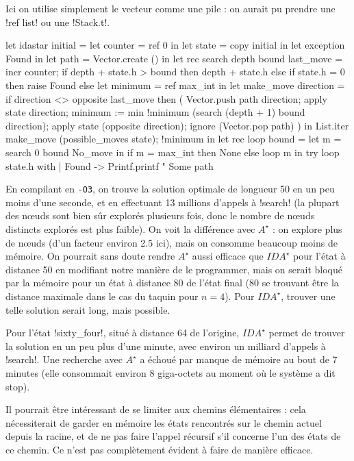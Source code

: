 \begin{ques}
  Ici on utilise simplement le vecteur comme une pile :
  on aurait pu prendre une \ml!ref list! ou une \ml!Stack.t!.
\begin{ocaml}
let idastar initial =
  let counter = ref 0 in
  let state = copy initial in
  let exception Found in
  let path = Vector.create () in
  let rec search depth bound last_move =
    incr counter;
    if depth + state.h > bound then depth + state.h
    else if state.h = 0 then raise Found
    else
      let minimum = ref max_int in
      let make_move direction =
        if direction <> opposite last_move then (
          Vector.push path direction;
          apply state direction;
          minimum := min !minimum (search (depth + 1) bound direction);
          apply state (opposite direction);
          ignore (Vector.pop path)
        ) in
      List.iter make_move (possible_moves state);
      !minimum in
  let rec loop bound =
    let m = search 0 bound No_move in
    if m = max_int then None
    else loop m in
  try
    loop state.h
  with
  | Found ->
    Printf.printf "%
    Some path
\end{ocaml}
  En compilant en \verb!-O3!, on trouve la solution optimale de longueur
  50 en un peu moins d'une seconde, et en effectuant 13 millions
  d'appels à \ml!search! (la plupart des nœuds sont bien sûr explorés
  plusieurs fois, donc le nombre de nœuds distincts explorés est plus faible).
  On voit la différence avec $A^{\star}$ : on explore plus de nœuds
  (d'un facteur environ 2.5 ici), mais on consomme beaucoup moins de
  mémoire. On pourrait sans doute rendre $A^{\star}$ aussi efficace que
  $IDA^{\star}$ pour l'état à distance 50 en modifiant notre manière de
  le programmer, mais on serait bloqué par la mémoire pour un état à
  distance 80 de l'état final (80 se trouvant être la distance maximale
  dans le cas du taquin pour $n = 4$). Pour $IDA^{\star}$, trouver une
  telle solution serait long, mais possible.

  Pour l'état \ml!sixty_four!, situé à distance 64 de l'origine,
  $IDA^{\star}$ permet de trouver la solution en un peu plus d'une
  minute, avec environ un milliard d'appels à \ml!search!. Une recherche
  avec $A^{\star}$ a échoué par manque de mémoire au bout de 7 minutes
  (elle consommait environ 8 giga-octets au moment où le système a dit
  stop).
\end{ques}

\begin{rem}
  Il pourrait être intéressant de se limiter aux chemins élémentaires :
  cela nécessiterait de garder en mémoire les états rencontrés sur
  le chemin actuel depuis la racine, et de ne pas faire l'appel récursif
  s'il concerne l'un des états de ce chemin. Ce n'est pas complètement
  évident à faire de manière efficace.
\end{rem}

